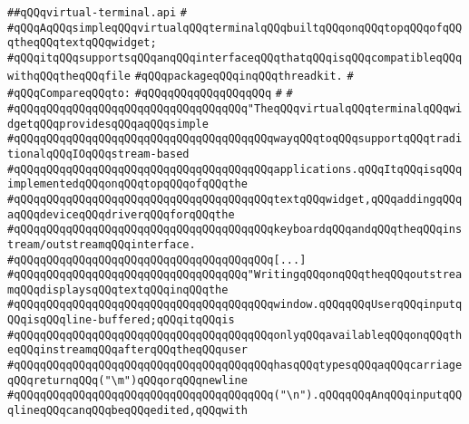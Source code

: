 \label{src/lib/x-kit/widget/old/text/virtual-terminal.api}
\verb|##qQQqvirtual-terminal.api|\newline
\verb|#|\newline
\verb|#qQQqAqQQqsimpleqQQqvirtualqQQqterminalqQQqbuiltqQQqonqQQqtopqQQqofqQQqtheqQQqtextqQQqwidget;|\newline
\verb|#qQQqitqQQqsupportsqQQqanqQQqinterfaceqQQqthatqQQqisqQQqcompatibleqQQqwithqQQqtheqQQqfile|\newline
\verb|#qQQqpackageqQQqinqQQqthreadkit.|\newline
\verb|#|\newline
\verb|#qQQqCompareqQQqto:|\newline
\verb|#qQQqqQQqqQQqqQQqqQQq|\newline
\verb|#|\newline
\verb|#|\newline
\verb|#qQQqqQQqqQQqqQQqqQQqqQQqqQQqqQQqqQQq"TheqQQqvirtualqQQqterminalqQQqwidgetqQQqprovidesqQQqaqQQqsimple|\newline
\verb|#qQQqqQQqqQQqqQQqqQQqqQQqqQQqqQQqqQQqqQQqwayqQQqtoqQQqsupportqQQqtraditionalqQQqIOqQQqstream-based|\newline
\verb|#qQQqqQQqqQQqqQQqqQQqqQQqqQQqqQQqqQQqqQQqapplications.qQQqItqQQqisqQQqimplementedqQQqonqQQqtopqQQqofqQQqthe|\newline
\verb|#qQQqqQQqqQQqqQQqqQQqqQQqqQQqqQQqqQQqqQQqtextqQQqwidget,qQQqaddingqQQqaqQQqdeviceqQQqdriverqQQqforqQQqthe|\newline
\verb|#qQQqqQQqqQQqqQQqqQQqqQQqqQQqqQQqqQQqqQQqkeyboardqQQqandqQQqtheqQQqinstream/outstreamqQQqinterface.|\newline
\verb|#qQQqqQQqqQQqqQQqqQQqqQQqqQQqqQQqqQQqqQQq[...]|\newline
\verb|#qQQqqQQqqQQqqQQqqQQqqQQqqQQqqQQqqQQq"WritingqQQqonqQQqtheqQQqoutstreamqQQqdisplaysqQQqtextqQQqinqQQqthe|\newline
\verb|#qQQqqQQqqQQqqQQqqQQqqQQqqQQqqQQqqQQqqQQqwindow.qQQqqQQqUserqQQqinputqQQqisqQQqline-buffered;qQQqitqQQqis|\newline
\verb|#qQQqqQQqqQQqqQQqqQQqqQQqqQQqqQQqqQQqqQQqonlyqQQqavailableqQQqonqQQqtheqQQqinstreamqQQqafterqQQqtheqQQquser|\newline
\verb|#qQQqqQQqqQQqqQQqqQQqqQQqqQQqqQQqqQQqqQQqhasqQQqtypesqQQqaqQQqcarriageqQQqreturnqQQq("\m")qQQqorqQQqnewline|\newline
\verb|#qQQqqQQqqQQqqQQqqQQqqQQqqQQqqQQqqQQqqQQq("\n").qQQqqQQqAnqQQqinputqQQqlineqQQqcanqQQqbeqQQqedited,qQQqwith|\newline
